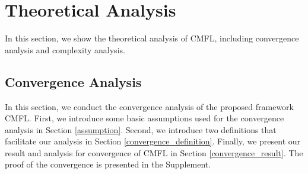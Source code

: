 \documentclass[10pt,journal,compsoc]{IEEEtran}
\begin{document}
%


\section{Theoretical Analysis}

In this section, we show the theoretical analysis of CMFL, including convergence analysis and complexity analysis. 

\subsection{Convergence Analysis}
\label{convergenceAnalysis}

In this section, we conduct the convergence analysis of the proposed framework CMFL. First, we introduce some basic assumptions used for the convergence analysis in Section \ref{assumption}. Second, we introduce two definitions that facilitate our analysis in Section \ref{convergence_definition}. Finally, we present our result and analysis for convergence of CMFL in Section \ref{convergence_result}. The proof of the convergence is presented in the Supplement.
\end{document}
